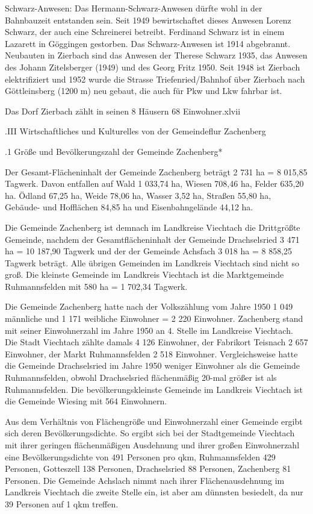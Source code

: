 Schwarz-Anwesen: Das Hermann-Schwarz-Anwesen dürfte wohl in der Bahnbauzeit
entstanden sein. Seit 1949 bewirtschaftet dieses Anwesen Lorenz Schwarz, der
auch eine Schreinerei betreibt. Ferdinand Schwarz ist in einem Lazarett in
Göggingen gestorben. Das Schwarz-Anwesen ist 1914 abgebrannt. Neubauten in
Zierbach sind das Anwesen der Therese Schwarz 1935, das Anwesen des Johann
Zitelsberger (1949) und des Georg Fritz 1950. Seit 1948 ist Zierbach
elektrifiziert und 1952 wurde die Strasse Triefenried/Bahnhof über Zierbach nach
Göttleinsberg (1200 m) neu gebaut, die auch für Pkw und Lkw fahrbar ist.

Das Dorf Zierbach zählt in seinen 8 Häusern 68 Einwohner.xlvii

.III Wirtschaftliches und Kulturelles von der Gemeindeflur Zachenberg

.1 Größe und Bevölkerungszahl der Gemeinde Zachenberg*

Der Gesamt-Flächeninhalt der Gemeinde Zachenberg beträgt 2 731 ha = 8 015,85
Tagwerk. Davon entfallen auf Wald 1 033,74 ha, Wiesen 708,46 ha, Felder 635,20
ha. Ödland 67,25 ha, Weide 78,06 ha, Wasser 3,52 ha, Straßen 55,80 ha, Gebäude-
und Hofflächen 84,85 ha und Eisenbahngelände 44,12 ha.

Die Gemeinde Zachenberg ist demnach im Landkreise Viechtach die Drittgrößte
Gemeinde, nachdem der Gesamtflächeninhalt der Gemeinde Drachselsried 3 471 ha =
10 187,90 Tagwerk und der der Gemeinde Achsfach 3 018 ha = 8 858,25 Tagwerk
beträgt. Alle übrigen Gemeinden im Landkreis Viechtach sind nicht so groß. Die
kleinste Gemeinde im Landkreis Viechtach ist die Marktgemeinde Ruhmannsfelden
mit 580 ha = 1 702,34 Tagwerk.

Die Gemeinde Zachenberg hatte nach der Volkszählung vom Jahre 1950 1 049
männliche und 1 171 weibliche Einwohner = 2 220 Einwohner. Zachenberg stand mit
seiner Einwohnerzahl im Jahre 1950 an 4. Stelle im Landkreise Viechtach. Die
Stadt Viechtach zählte damals 4 126 Einwohner, der Fabrikort Teisnach 2 657
Einwohner, der Markt Ruhmannsfelden 2 518 Einwohner. Vergleichsweise hatte die
Gemeinde Drachselsried im Jahre 1950 weniger Einwohner als die Gemeinde
Ruhmannsfelden, obwohl Drachselsried flächenmäßig 20-mal größer ist als
Ruhmannsfelden. Die bevölkerungskleinste Gemeinde im Landkreis Viechtach ist die
Gemeinde Wiesing mit 564 Einwohnern.

Aus dem Verhältnis von Flächengröße und Einwohnerzahl einer Gemeinde ergibt sich
deren Bevölkerungsdichte. So ergibt sich bei der Stadtgemeinde Viechtach mit
ihrer geringen flächenmäßigen Ausdehnung und ihrer großen Einwohnerzahl eine
Bevölkerungsdichte von 491 Personen pro qkm, Ruhmannsfelden 429 Personen,
Gotteszell 138 Personen, Drachselsried 88 Personen, Zachenberg 81 Personen. Die
Gemeinde Achslach nimmt nach ihrer Flächenausdehnung im Landkreis Viechtach die
zweite Stelle ein, ist aber am dünnsten besiedelt, da nur 39 Personen auf 1 qkm
treffen.

